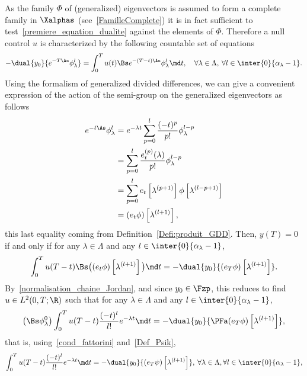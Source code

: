 As the family $\Phi$ of (generalized) eigenvectors is assumed to form a complete family in $\Xalphas$ (see~\eqref{FamilleComplete}) it is in fact sufficient to test~\eqref{premiere_equation_dualite} against the elements of $\Phi$. Therefore a null control $u$ is characterized by the following countable set of equations
\begin{equation}\label{pb_moment_v1}
-\dual{y_0}{e^{-T \As} \phi_\lambda^l} = \int_0^T u(t) \Bs e^{-(T-t) \As} \phi_\lambda^l \md t, \quad \forall \lambda \in \Lambda, \: \forall l \in \inter{0}{\alpha_\lambda-1}.
\end{equation}
Using the formalism of generalized divided differences, we can give a convenient expression of the action of the semi-group on the generalized eigenvectors as follows
\begin{equation}\label{Action_SemiGroupe_DDgeneralisees}
\begin{aligned}
e^{-t\As} \phi_\lambda^l & = e^{-\lambda t} \sum_{p=0}^l \frac{(-t)^p}{p!} \phi_\lambda^{l-p} \\
& = \sum_{p=0}^l \frac{e_t^{(p)}(\lambda)}{p!} \phi_\lambda^{l-p} \\
& = \sum_{p=0}^l e_t\left[\lambda^{(p+1)}\right] \phi\left[\lambda^{(l-p+1)}\right] \\
& = (e_t \phi) \left[\lambda^{(l+1)}\right],
\end{aligned}
\end{equation}
this last equality coming from Definition~\ref{Defi:produit_GDD}. Then, $y(T)=0$ if and only if for any $\lambda\in \Lambda$ and any $l\in \inter{0}{\alpha_{\lambda}-1}$,
\[
\int_0^T u(T-t) \Bs \big((e_t \phi) \left[\lambda^{(l+1)}\right] \big) \md t = -\dual{y_0}{(e_T \phi) \left[\lambda^{(l+1)}\right] }.
\]
By~\eqref{normalisation_chaine_Jordan}, and since $y_0\in \Fzp$, this reduces to find $u \in L^2(0,T;\R)$ such that for any $\lambda\in \Lambda$ and any $l\in \inter{0}{\alpha_{\lambda}-1}$,
\[
\left(\Bs \phi_{\lambda}^0\right) \int_0^T u(T-t) \frac{(-t)^l}{l!} e^{-\lambda t} \md t = -\dual{y_0}{\PFa (e_T \phi) \left[\lambda^{(l+1)}\right] },
\]
that is, using~\eqref{cond_fattorini} and~\eqref{Def_Psik},
\begin{equation}\label{Pbmoment_DDgeneralisees}
\int_0^T u(T-t) \frac{(-t)^l}{l!} e^{-\lambda t} \md t = -\dual{y_0}{(e_T \psi) \left[\lambda^{(l+1)}\right] }, \: \forall \lambda\in \Lambda,\forall l\in \inter{0}{\alpha_{\lambda}-1},
\end{equation}



